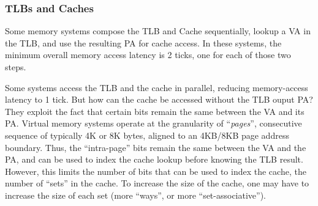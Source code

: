 
\subsubsection{TLBs and Caches}

Some memory systems compose the TLB and Cache sequentially, {\ie}
lookup a VA in the TLB, and use the resulting PA for cache access.
In these systems, the minimum overall memory access latency is 2 ticks,
one for each of those two steps.


Some systems access the TLB and the cache in parallel, reducing
memory-access latency to 1 tick.  But how can the cache be accessed
without the TLB ouput PA?  They exploit the fact that certain bits
remain the same between the VA and its PA.  Virtual memory systems
operate at the granularity of ``\emph{pages}'', consecutive sequence
of typically 4K or 8K bytes, aligned to an 4KB/8KB page address
boundary.  Thus, the ``intra-page'' bits remain the same between the
VA and the PA, and can be used to index the cache lookup before
knowing the TLB result.  However, this limits the number of bits that
can be used to index the cache, {\ie} the number of ``sets'' in the
cache.  To increase the size of the cache, one may have to increase
the size of each set (more ``ways'', or more ``set-associative'').

